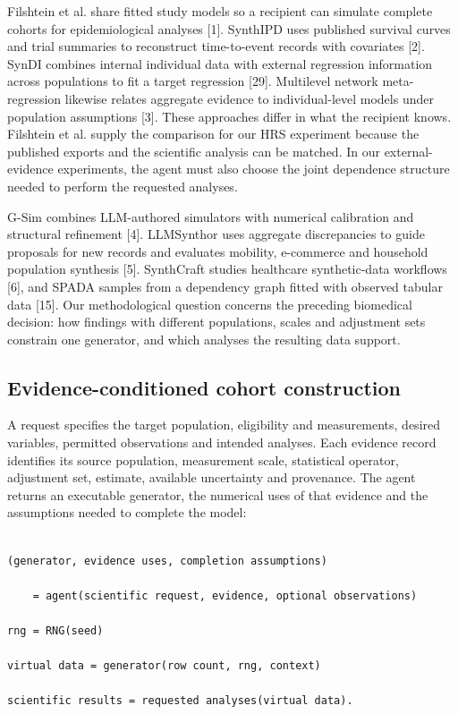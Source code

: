\documentclass[sigconf,review]{acmart}
\begin{document}
Filshtein et al. share fitted study models so a recipient can simulate complete cohorts for epidemiological analyses [1]. SynthIPD uses published survival curves and trial summaries to reconstruct time-to-event records with covariates [2]. SynDI combines internal individual data with external regression information across populations to fit a target regression [29]. Multilevel network meta-regression likewise relates aggregate evidence to individual-level models under population assumptions [3]. These approaches differ in what the recipient knows. Filshtein et al. supply the comparison for our HRS experiment because the published exports and the scientific analysis can be matched. In our external-evidence experiments, the agent must also choose the joint dependence structure needed to perform the requested analyses.


G-Sim combines LLM-authored simulators with numerical calibration and structural refinement [4]. LLMSynthor uses aggregate discrepancies to guide proposals for new records and evaluates mobility, e-commerce and household population synthesis [5]. SynthCraft studies healthcare synthetic-data workflows [6], and SPADA samples from a dependency graph fitted with observed tabular data [15]. Our methodological question concerns the preceding biomedical decision: how findings with different populations, scales and adjustment sets constrain one generator, and which analyses the resulting data support.


\subsection{Evidence-conditioned cohort construction}

A request specifies the target population, eligibility and measurements, desired variables, permitted observations and intended analyses. Each evidence record identifies its source population, measurement scale, statistical operator, adjustment set, estimate, available uncertainty and provenance. The agent returns an executable generator, the numerical uses of that evidence and the assumptions needed to complete the model:


\noindent\begin{minipage}{\columnwidth}

\begin{lstlisting}

(generator, evidence uses, completion assumptions)

    = agent(scientific request, evidence, optional observations)

rng = RNG(seed)

virtual data = generator(row count, rng, context)

scientific results = requested analyses(virtual data).

\end{lstlisting}

\end{minipage}
\end{document}
